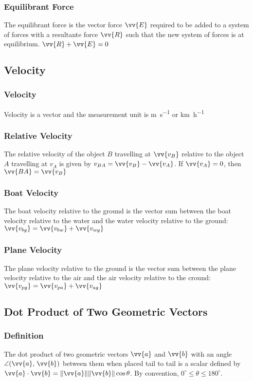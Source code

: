 \documentclass{article}
\newcommand{\mv}[1]{
	\lVert\vv{#1}\rVert
}
\begin{document}
	\subsubsection{Equilibrant Force}
	The equilibrant force is the vector force $\vv{E}$ required to be added to a system of forces with a resultante force $\vv{R}$ such that the new system of forces is at equilibrium. $\vv{R}+\vv{E}=0$
	\subsection{Velocity}
	\subsubsection{Velocity}
	Velocity is a vector and the measurement unit is \si{\meter\per\second} or \si{\kilo\meter\per\hour}
	\subsubsection{Relative Velocity}
	The relative velocity of the object $B$ travelling at $\vv{v_B}$ relative to the object $A$ travelling at $v_A$ is given by $v_{BA}=\vv{v_B}-\vv{v_A}$. If $\vv{v_A}=0$, then $\vv{BA}=\vv{v_B}$
	\subsubsection{Boat Velocity}
	The boat velocity relative to the ground is the vector sum between the boat velocity relative to the water and the water velocity relative to the ground: $\vv{v_{bg}}=\vv{v_{bw}}+\vv{v_{wg}}$
	\subsubsection{Plane Velocity}
	The plane velocity relative to the ground is the vector sum between the plane velocity relative to the air and the air velocity relative to the cround: $\vv{v_{pg}}=\vv{v_{pa}}+\vv{v_{ag}}$
	\subsection{Dot Product of Two Geometric Vectors}
	\subsubsection{Definition}
	The dot product of two geometric vectors $\vv{a}$ and $\vv{b}$ with an angle $\angle(\vv{a},\,\vv{b})$ between them when placed tail to tail is a scalar defined by $\vv{a}\cdot\vv{b}=\mv{a}\mv{b}\cos\theta$. By convention, $0^\circ\leq\theta\leq180^\circ$. %
\end{document}

